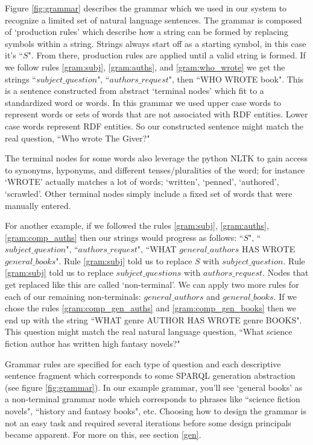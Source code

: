 \documentclass[11pt]{article}
\begin{document}
Figure \ref{fig:grammar} describes the grammar which we used in our system to recognize
a limited set of natural language sentences. The grammar is composed of `production
rules' which describe how a string can be formed by replacing symbols within a
string. Strings always start off as a starting symbol, in this case it's ``$S$". From there,
production rules are applied until a valid string is formed. If we follow rules 
\ref{gram:subj}, \ref{gram:auths}, and \ref{gram:who_wrote} we get the strings 
``$subject\_question$", ``$authors\_request$", then ``WHO WROTE book". This is a sentence
constructed from abstract `terminal nodes' which fit to a standardized word or words.
In this grammar we used upper case words to represent words or sets of words that are 
not associated with RDF entities. Lower case words represent RDF entities. 
So our constructed sentence might match the real question, ``Who wrote The Giver?"

The terminal nodes for some words also leverage the python NLTK\cite{nltk} to gain access 
to synonyms, hyponyms, and different tenses/pluralities of the word; 
for instance `WROTE' actually matches a lot of words; 
`written', `penned', `authored', `scrawled'. Other terminal nodes
simply include a fixed set of words that were manually entered.

For another example, if we followed the rules \ref{gram:subj}, \ref{gram:auths}, 
\ref{gram:comp_auths} then our strings would progress as follows: 
``$S$", ``$subject\_question$", ``$authors\_request$", 
``WHAT $general\_authors$ HAS WROTE $general\_books$". Rule \ref{gram:subj} told us to 
replace $S$ with $subject\_question$. Rule \ref{gram:subj} told us to replace
$subject\_questions$ with $authors\_request$. Nodes that get replaced like this
are called `non-terminal'. We can apply two more rules for each of our remaining
non-terminals: $general\_authors$ and $general\_books$. If we chose the rules
\ref{gram:comp_gen_auths} and \ref{gram:comp_gen_books} then we end up with the
string ``WHAT genre AUTHOR HAS WROTE genre BOOKS". This question might match the
real natural language question, ``What science fiction author has written 
high fantasy novels?"

Grammar rules are specified for each type of question and each descriptive sentence
fragment which corresponds to some SPARQL generation abstraction (see 
figure \ref{fig:grammar}). In our example grammar, you'll see `general books' as a
non-terminal grammar node which corresponds to phrases like ``science fiction novels",
``history and fantasy books", etc. Choosing how to design the grammar is not an
easy task and required several iterations before some design principals became apparent.
For more on this, see section \ref{gen}. 
\end{document}
